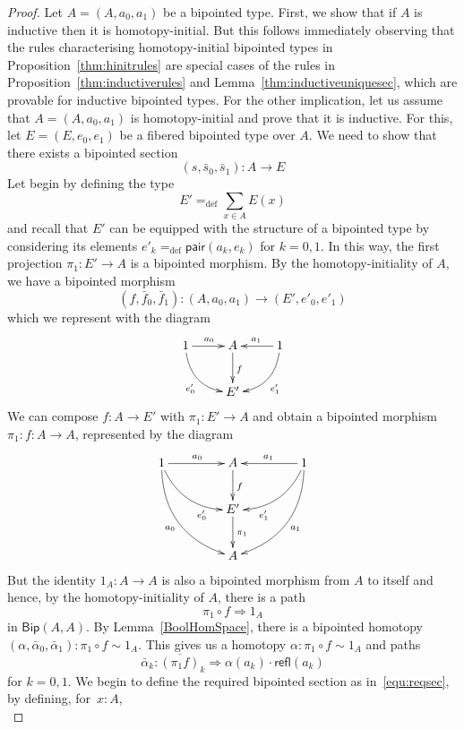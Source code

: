 \documentclass[10pt,a4paper,oneside,reqno]{amsart}
\numberwithin{equation}{section}
\theoremstyle{mythm}
\theoremstyle{mydef}
\theoremstyle{myrmk}
\newcommand{\defeq}{=_{\mathrm{def}}}
\newcommand{\co}{\colon}
\newcommand{\pair}{\mathsf{pair}}
\newcommand{\refl}{\mathsf{refl}}
\newcommand{\Bip}{\mathsf{Bip}}
\begin{document}
\begin{proof} Let $A = (A, a_0, a_1)$ be a bipointed type. First, we show that if $A$ is inductive then
it is homotopy-initial. But this follows immediately observing that the rules characterising homotopy-initial bipointed types in Proposition~\ref{thm:hinitrules}
are special cases of the rules in Proposition~\ref{thm:inductiverules} and Lemma~\ref{thm:inductiveuniquesec},
which are provable for inductive bipointed types. For the other implication, 
let us assume that $A = (A, a_0, a_1)$ is homotopy-initial and prove that it is inductive. 
For this, let $E = (E, e_0, e_1)$ be a fibered bipointed type over $A$. We need to show that there
exists a bipointed section
\begin{equation}
\label{equ:reqsec}
(s, \bar{s}_0, \bar{s}_1) \co A \to E
\end{equation}
Let begin by defining the type 
\[
E' \defeq \sum_{x \in A} E(x) 
\]
and recall that $E'$ can be equipped with the structure of a bipointed type by considering its elements $e'_k \defeq \pair(a_k, e_k)$ for $k = 0, 1$. In this way,  the first projection $\pi_1 \co E' \to A$ is a bipointed morphism. By the homotopy-initiality of $A$, we have a bipointed morphism 
\[
(f, \bar{f}_0, \bar{f}_1) \co (A, a_0, a_1)  \to (E', e'_0, e'_1) 
\]
which we represent with the diagram
\[
\xymatrix{
1 \ar@/_1pc/[dr]_{e'_0} \ar[r]^{a_0} & A  \ar[d]^f & 1 \ar[l]_{a_1} \ar@/^1pc/[dl]^{e'_1} \\
 & E' & }
 \]
 We can compose $f \co A \to E'$ with $\pi_1 \co E' \to A$ and obtain a bipointed morphism $\pi_1 \co f \co A \to A$, represented by the diagram
  \[
\xymatrix@C=1.5cm{
1 \ar@/_1pc/[dr]_(.7){e'_0} \ar[r]^{a_0} \ar@/_1.5pc/[ddr]_{a_0}  & A  \ar[d]^f & 1 \ar[l]_{a_1} \ar@/^1pc/[dl]^(.7){e'_1} \ar@/^1.5pc/[ddl]^{a_1}  \\
 & E' \ar[d]^{\pi_1} & \\
 & A &  }
 \]
But the identity $1_A \co A \to A$ is also a bipointed morphism from $A$ to itself and hence, by the homotopy-initiality of $A$, there is a path
\[
\pi_1 \circ f \Rightarrow 1_A 
\]
in $\Bip(A,A)$. By Lemma~\ref{BoolHomSpace}, there  is a bipointed homotopy $(\alpha,
\bar{\alpha}_0,\bar{\alpha}_1) \co \pi_1 \circ f \sim 1_A$. This gives us a homotopy $\alpha \co \pi_1 \circ f \sim 1_A$ and paths
\[
\bar{\alpha}_k \co \overline{(\pi_1 f)}_k \Rightarrow \alpha(a_k) \cdot \refl(a_k) 
\]
for $k = 0, 1$. We begin to define the required bipointed section as in~\eqref{equ:reqsec}, by defining, for~$x \co A$, 
\begin{equation}

\end{equation}
\end{proof}
\end{document}
